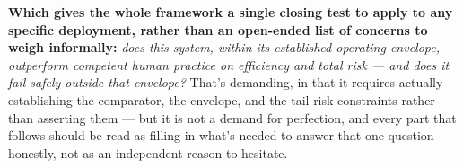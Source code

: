 \textbf{Which gives the whole framework a single closing test to apply to any specific deployment, rather than an open-ended list of concerns to weigh informally:} \emph{does this system, within its established operating envelope, outperform competent human practice on efficiency and total risk --- and does it fail safely outside that envelope?} That's demanding, in that it requires actually establishing the comparator, the envelope, and the tail-risk constraints rather than asserting them --- but it is not a demand for perfection, and every part that follows should be read as filling in what's needed to answer that one question honestly, not as an independent reason to hesitate.
